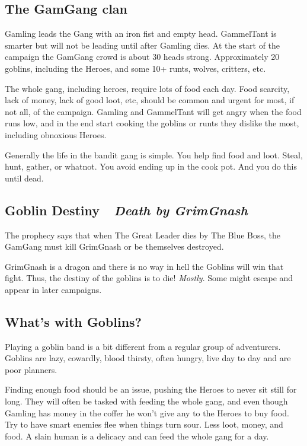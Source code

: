 \subsection*{The GamGang clan}

Gamling leads the Gang with an iron fist and empty head. GammelTant is smarter but will not be leading until after Gamling dies.
At the start of the campaign the GamGang crowd is about 30 heads strong. Approximately 20 goblins, including the Heroes, and some 10+ runts, wolves, critters, etc.

The whole gang, including heroes, require lots of food each day. Food scarcity, lack of money, lack of good loot, etc, should be common and urgent for most, if not all, of the campaign. Gamling and GammelTant will get angry when the food runs low, and in the end start cooking the goblins or runts they dislike the most, including obnoxious Heroes.

Generally the life in the bandit gang is simple. You help find food and loot. Steal, hunt, gather, or whatnot. You avoid ending up in the cook pot. And you do this until dead.


\subsection*{Goblin Destiny~\mdash~\emph{Death by GrimGnash}}   %

The prophecy says that when The Great Leader dies by The Blue Boss, the GamGang must kill GrimGnash or be themselves destroyed.

GrimGnash is a dragon and there is no way in hell the Goblins will win that fight. Thus, the destiny of the goblins is to die! \emph{Mostly}. Some might escape and appear in later campaigns.


\subsection*{What's with Goblins?}

Playing a goblin band is a bit different from a regular group of adventurers. Goblins are lazy, cowardly, blood thirsty, often hungry, live day to day and are poor planners.

Finding enough food should be an issue, pushing the Heroes to never sit still for long. They will often be tasked with feeding the whole gang, and even though Gamling has money in the coffer he won't give any to the Heroes to buy food. Try to have smart enemies flee when things turn sour. Less loot, money, and food. A slain human is a delicacy and can feed the whole gang for a day.

